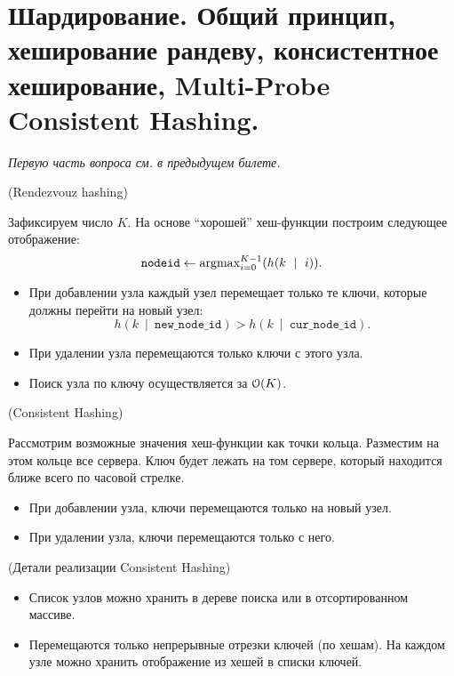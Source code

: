 \section{Шардирование. Общий принцип, хеширование рандеву, консистентное 
хеширование, Multi-Probe Consistent Hashing.}

\textit{Первую часть вопроса см. в предыдущем билете.}

\begin{algorithm}(Rendezvouz hashing)
    
    Зафиксируем число $K$. На основе ``хорошей'' хеш-функции построим
    следующее отображение:
    \[
        \texttt{nodeid} \leftarrow \operatorname{argmax}_{i = 0}^{K - 1}(h(k~\mid~i))
    .\]
    \begin{itemize}
        \item При добавлении узла каждый узел перемещает только те ключи,
            которые должны перейти на новый узел:
            \[
                h(k~\mid~\texttt{new\_node\_id}) > h(k~\mid~\texttt{cur\_node\_id})   
            .\]
        \item При удалении узла перемещаются только ключи с этого узла.
        \item Поиск узла по ключу осуществляется за $\mathcal{O}(K)$.
    \end{itemize}
\end{algorithm} 

\begin{algorithm}(Consistent Hashing)
    
    Рассмотрим возможные значения хеш-функции как точки кольца. Разместим на этом
    кольце все сервера. Ключ будет лежать на том сервере, который находится ближе всего
    по часовой стрелке. 
    \begin{itemize}
        \item При добавлении узла, ключи перемещаются только на новый узел.
        \item При удалении узла, ключи перемещаются только с него.
    \end{itemize}
\end{algorithm}

\begin{remark}(Детали реализации Consistent Hashing)
    \enewline
    \begin{itemize}
        \item Список узлов можно хранить в дереве поиска или в отсортированном массиве.
        \item Перемещаются только непрерывные отрезки ключей (по хешам). На каждом
            узле можно хранить отображение из хешей в списки ключей.
    \end{itemize}
\end{remark}

